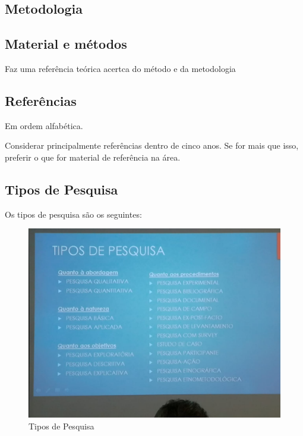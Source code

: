     \subsection{Metodologia}

        \subsection{Material e métodos}
            Faz uma referência teórica acertca do método e da metodologia

        \subsection{Referências}
            Em ordem alfabética.

            Considerar principalmente referências dentro de cinco anos. Se for mais que isso, preferir o que for material de referência na área.
    
    \subsection{Tipos de Pesquisa}
        Os tipos de pesquisa são os seguintes:

        \begin{figure}[h]
            \centering
            \includegraphics[width=1\textwidth]{figuras/tipos-pesquisa}
            \caption[Figura]{Tipos de Pesquisa}
            \label{tipos-pesquisa}
        \end{figure}



